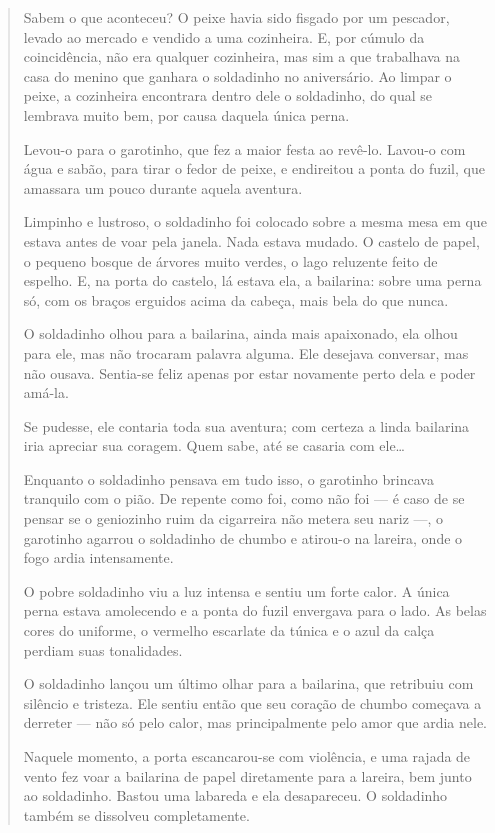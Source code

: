 \begin{escolha}
\begin{escolha}
{\begin{escolha}
\begin{quote}
Sabem o que aconteceu? O peixe havia sido fisgado por um pescador,
levado ao mercado e vendido a uma cozinheira. E, por cúmulo da
coincidência, não era qualquer cozinheira, mas sim a que trabalhava na
casa do menino que ganhara o soldadinho no aniversário. Ao limpar o
peixe, a cozinheira encontrara dentro dele o soldadinho, do qual se
lembrava muito bem, por causa daquela única perna.

Levou-o para o garotinho, que fez a maior festa ao revê-lo. Lavou-o com
água e sabão, para tirar o fedor de peixe, e endireitou a ponta do
fuzil, que amassara um pouco durante aquela aventura.

Limpinho e lustroso, o soldadinho foi colocado sobre a mesma mesa em que
estava antes de voar pela janela. Nada estava mudado. O castelo de
papel, o pequeno bosque de árvores muito verdes, o lago reluzente feito
de espelho. E, na porta do castelo, lá estava ela, a bailarina: sobre
uma perna só, com os braços erguidos acima da cabeça, mais bela do que
nunca.

O soldadinho olhou para a bailarina, ainda mais apaixonado, ela olhou
para ele, mas não trocaram palavra alguma. Ele desejava conversar, mas
não ousava. Sentia-se feliz apenas por estar novamente perto dela e
poder amá-la.

Se pudesse, ele contaria toda sua aventura; com certeza a linda
bailarina iria apreciar sua coragem. Quem sabe, até se casaria com
ele\ldots{}

Enquanto o soldadinho pensava em tudo isso, o garotinho brincava
tranquilo com o pião. De repente como foi, como não foi --- é caso de se
pensar se o geniozinho ruim da cigarreira não metera seu nariz ---, o
garotinho agarrou o soldadinho de chumbo e atirou-o na lareira, onde o
fogo ardia intensamente.

O pobre soldadinho viu a luz intensa e sentiu um forte calor. A única
perna estava amolecendo e a ponta do fuzil envergava para o lado. As
belas cores do uniforme, o vermelho escarlate da túnica e o azul da
calça perdiam suas tonalidades.

O soldadinho lançou um último olhar para a bailarina, que retribuiu com
silêncio e tristeza. Ele sentiu então que seu coração de chumbo começava
a derreter --- não só pelo calor, mas principalmente pelo amor que ardia
nele.

Naquele momento, a porta escancarou-se com violência, e uma rajada de
vento fez voar a bailarina de papel diretamente para a lareira, bem
junto ao soldadinho. Bastou uma labareda e ela desapareceu. O soldadinho
também se dissolveu completamente.


\end{quote}
\end{escolha}}
\end{escolha}
\end{escolha}

